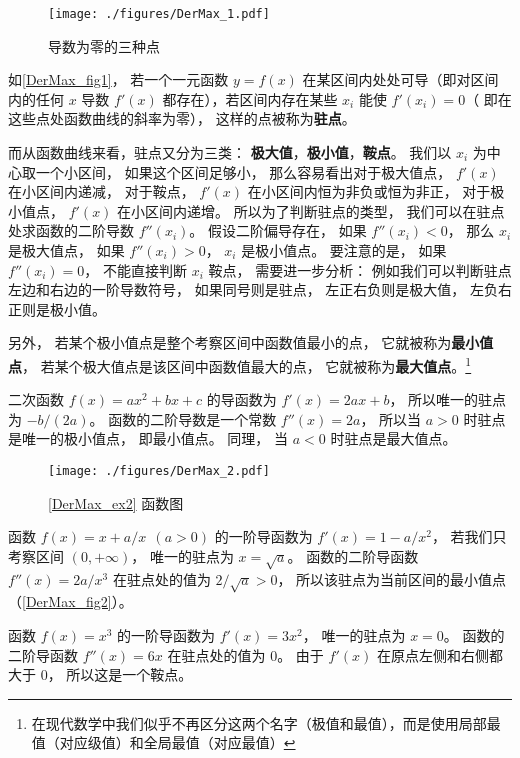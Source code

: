 
\begin{figure}[ht]
\vskip-10pt
\centering
\texttt{[image: ./figures/DerMax\_1.pdf]}
\caption{导数为零的三种点}\label{DerMax_fig1}
\end{figure}

如\autoref{DerMax_fig1}， 若一个一元函数 $y = f(x)$ 在某区间内处处可导（即对区间内的任何 $x$ 导数 $f'(x)$ 都存在），若区间内存在某些 $x_i$ 能使 $f'(x_i) = 0$（ 即在这些点处函数曲线的斜率为零）， 这样的点被称为\textbf{驻点}。

而从函数曲线来看，驻点又分为三类： \textbf{极大值}，\textbf{极小值}，\textbf{鞍点}。 我们以 $x_i$ 为中心取一个小区间， 如果这个区间足够小， 那么容易看出对于极大值点， $f'(x)$ 在小区间内递减， 对于鞍点， $f'(x)$ 在小区间内恒为非负或恒为非正， 对于极小值点， $f'(x)$ 在小区间内递增。 所以为了判断驻点的类型， 我们可以在驻点处求函数的二阶导数 $f''(x_i)$。 假设二阶偏导存在， 如果 $f''(x_i) < 0$， 那么 $x_i$ 是极大值点， 如果 $f''(x_i) > 0$， $x_i$ 是极小值点。 要注意的是， 如果 $f''(x_i) = 0$， 不能直接判断 $x_i$  鞍点， 需要进一步分析： 例如我们可以判断驻点左边和右边的一阶导数符号， 如果同号则是驻点， 左正右负则是极大值， 左负右正则是极小值。

另外， 若某个极小值点是整个考察区间中函数值最小的点， 它就被称为\textbf{最小值点}， 若某个极大值点是该区间中函数值最大的点， 它就被称为\textbf{最大值点}。\footnote{在现代数学中我们似乎不再区分这两个名字（极值和最值），而是使用局部最值（对应级值）和全局最值（对应最值）}

\begin{example}{}
二次函数 $f(x) = ax^2 + bx + c$ 的导函数为 $f'(x) = 2ax + b$， 所以唯一的驻点为 $-b/(2a)$。 函数的二阶导数是一个常数 $f''(x) = 2a$， 所以当 $a > 0$ 时驻点是唯一的极小值点， 即最小值点。 同理， 当 $a < 0$ 时驻点是最大值点。
\end{example}

\begin{figure}[ht]
\centering
\texttt{[image: ./figures/DerMax\_2.pdf]}
\caption{\autoref{DerMax_ex2} 函数图} \label{DerMax_fig2}
\end{figure}

\begin{example}{}\label{DerMax_ex2}
函数 $f(x) = x+a/x \ \ (a > 0)$ 的一阶导函数为 $f'(x) = 1 - a/x^2$， 若我们只考察区间 $(0, +\infty)$， 唯一的驻点为 $x = \sqrt{a}$。 函数的二阶导函数 $f''(x) = 2a/x^3$ 在驻点处的值为 $2/\sqrt{a} > 0$， 所以该驻点为当前区间的最小值点（\autoref{DerMax_fig2}）。
\end{example}

\begin{example}{}\label{DerMax_ex3}
函数 $f(x) = x^3$ 的一阶导函数为 $f'(x) = 3x^2$， 唯一的驻点为 $x = 0$。 函数的二阶导函数 $f''(x) = 6x$ 在驻点处的值为 $0$。 由于 $f'(x)$ 在原点左侧和右侧都大于 0， 所以这是一个鞍点。
\end{example}
